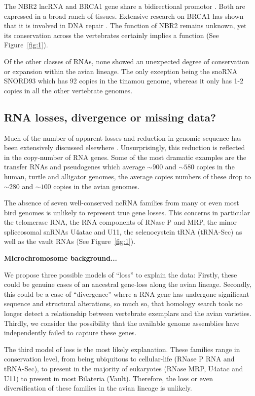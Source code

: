\documentclass[10pt]{bmc_article}
\newenvironment{bmcformat}{\begin{raggedright}\baselineskip20pt\sloppy\setboolean{publ}{false}}{\end{raggedright}\baselineskip20pt\sloppy}
\begin{document}
\begin{bmcformat}
The NBR2 lncRNA and BRCA1 gene share a bidirectional promotor
\cite{Xu:1997}. Both are expressed in a broad ranch of
tissues. Extensive research on BRCA1 has shown that it is involved in
DNA repair \cite{Moynahan:1999}. The function of NBR2 remains unknown,
yet its conservation across the vertebrates certainly implies a
function (See Figure~\ref{fig:1}).

Of the other classes of RNAs, none showed an unexpected degree of
conservation or expansion within the avian lineage. The only exception
being the snoRNA SNORD93 which has 92 copies in the tinamou
genome, whereas it only has 1-2 copies in all the other vertebrate
genomes. 

\subsection*{RNA losses, divergence or missing data?}
Much of the number of apparent losses and reduction in genomic
sequence has been extensively discussed elsewhere
\cite{Organ:2007}. Unsurprisingly, this reduction is reflected in the
copy-number of RNA genes. Some of the most dramatic examples are the
transfer RNAs and pseudogenes which average $\sim900$ and $\sim580$
copies in the human, turtle and alligator genomes, the average copies
numbers of these drop to $\sim280$ and $\sim100$ copies in the avian
genomes.

The absence of seven well-conserved ncRNA families from many or even
most bird genomes is unlikely to represent true gene losses. This
concerns in particular the telomerase RNA, the RNA components of RNase
P and MRP, the minor spliceosomal snRNAs U4atac and U11, the
selenocystein tRNA (tRNA-Sec) as well as the vault RNAs (See
Figure~\ref{fig:1}). 

{\bf Microchromosome background...}


We propose three possible models of ``loss'' to explain the data:
Firstly, these could be genuine cases of an ancestral gene-loss along
the avian lineage. Secondly, this could be a case of ``divergence''
where a RNA gene has undergone significant sequence and structural
alterations, so much so, that homology search tools no longer
detect a relationship between vertebrate exemplars and the avian
varieties. Thirdly, we consider the possibility that the available
genome assemblies have independently failed to capture these genes.

The third model of loss is the most likely explanation. These families
range in conservation level, from being ubiquitous to cellular-life
(RNase P RNA and tRNA-Sec), to present in the majority of eukaryotes
(RNase MRP, U4atac and U11) to present in most Bilateria
(Vault). Therefore, the loss or even diversification of these families
in the avian lineage is unlikely.


\end{bmcformat}
\end{document}
